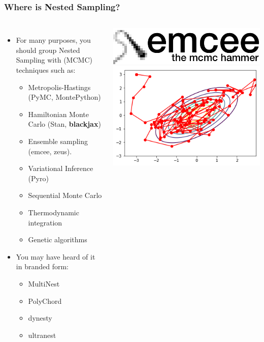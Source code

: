 \documentclass[aspectratio=169]{beamer}
\begin{document}
\begin{frame}
    \frametitle{Where is Nested Sampling?}
    \begin{columns}
        \begin{itemize}
            \item For many purposes, you should group Nested Sampling with (MCMC) techniques such as:
                \begin{itemize}
                    \item Metropolis-Hastings (PyMC, MontePython)
                    \item Hamiltonian Monte Carlo (Stan, \textbf{blackjax})
                    \item Ensemble sampling (emcee, zeus). 
                    \item Variational Inference (Pyro)
                    \item Sequential Monte Carlo 
                    \item Thermodynamic integration
                    \item Genetic algorithms
                \end{itemize}
            \item You may have heard of it in branded form:
                \begin{itemize}
                    \item MultiNest
                    \item PolyChord
                    \item dynesty
                    \item ultranest
                \end{itemize}
            \end{itemize}
        \begin{columns}
        \includegraphics[width=\textwidth]{figures/emcee}
        \includegraphics[width=\textwidth]{figures/metropolis-hastings}

\end{columns}
\end{columns}
\end{frame}
\end{document}
